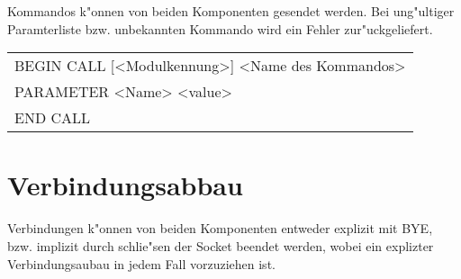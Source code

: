 Kommandos k"onnen von beiden Komponenten gesendet werden. Bei ung"ultiger Paramterliste bzw. 
unbekannten Kommando wird ein Fehler zur"uckgeliefert.

\begin{center}
\begin{tabular*}{350pt}{l}
BEGIN CALL [<Modulkennung>] <Name des Kommandos>\\
PARAMETER <Name> <value>\\
END CALL\\
\end{tabular*}
\end{center}

\section{Verbindungsabbau}

Verbindungen k"onnen von beiden Komponenten entweder explizit mit BYE, bzw. implizit durch 
schlie"sen der Socket beendet werden, wobei ein explizter Verbindungsaubau in jedem Fall
vorzuziehen ist.
